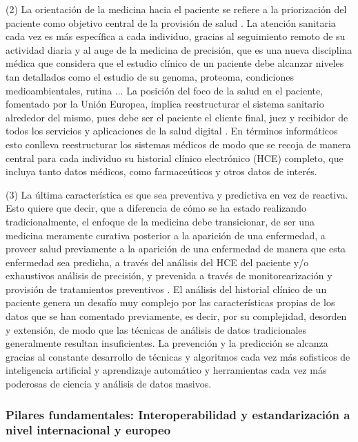 (2) La orientación de la medicina hacia el paciente se refiere a la priorización del paciente como objetivo central de la provisión de salud  \cite{tortorella2020healthcare}. La atención sanitaria cada vez es más específica a cada individuo, gracias al seguimiento remoto de su actividad diaria y al auge de la medicina de precisión, que es una nueva disciplina médica que considera que el estudio clínico de un paciente debe alcanzar niveles tan detallados como el estudio de su genoma, proteoma, condiciones medioambientales, rutina \cite{ruiz2023inteligencia}... La posición del foco de la salud en el paciente, fomentado por la Unión Europea,  implica reestructurar el sistema sanitario alrededor del mismo, pues debe ser el paciente el cliente final, juez y recibidor de todos los servicios y aplicaciones de la salud digital \cite{ntafi2022legal} \cite{katehakis2019framework}. En términos informáticos esto conlleva reestructurar los sistemas médicos de modo que se recoja de manera central para cada individuo su historial clínico electrónico (HCE) completo, que incluya tanto datos médicos, como farmaceúticos y otros datos de interés. 



(3) La última característica es que sea preventiva y predictiva en vez de reactiva. Esto quiere que decir, que a diferencia de cómo se ha estado realizando tradicionalmente, el enfoque de la medicina debe transicionar, de ser una medicina meramente curativa posterior a la aparición de una enfermedad, a proveer salud previamente a la aparición de una enfermedad de manera que esta enfermedad sea predicha, a través del análisis del HCE del paciente y/o exhaustivos análisis de precisión, y prevenida a través de monitorearización y provisión de tratamientos preventivos \cite{ruiz2023inteligencia}. El análisis del historial clínico de un paciente genera un desafío muy complejo por las características propias de los datos que se han comentado previamente, es decir, por su complejidad, desorden y extensión, de modo que las técnicas de análisis de datos tradicionales generalmente resultan insuficientes. La prevención y la predicción se alcanza gracias al constante desarrollo de técnicas y algoritmos cada vez más sofisticos de inteligencia artificial y aprendizaje automático y herramientas cada vez más poderosas de ciencia y análisis de datos masivos.


\subsubsection{Pilares fundamentales: Interoperabilidad y estandarización a nivel internacional y europeo}

